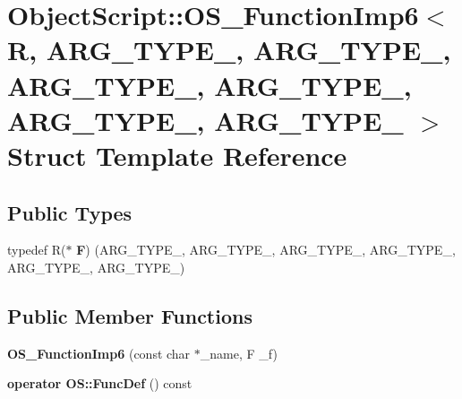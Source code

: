 \hypertarget{struct_object_script_1_1_o_s___function_imp6}{}\section{Object\+Script\+:\+:O\+S\+\_\+\+Function\+Imp6$<$ R, A\+R\+G\+\_\+\+T\+Y\+P\+E\+\_, A\+R\+G\+\_\+\+T\+Y\+P\+E\+\_, A\+R\+G\+\_\+\+T\+Y\+P\+E\+\_, A\+R\+G\+\_\+\+T\+Y\+P\+E\+\_, A\+R\+G\+\_\+\+T\+Y\+P\+E\+\_, A\+R\+G\+\_\+\+T\+Y\+P\+E\+\_ $>$ Struct Template Reference}
\label{struct_object_script_1_1_o_s___function_imp6}
\subsection*{Public Types}
\begin{DoxyCompactItemize}
\item 
typedef R($\ast$ {\bfseries F}) (A\+R\+G\+\_\+\+T\+Y\+P\+E\+\_, A\+R\+G\+\_\+\+T\+Y\+P\+E\+\_, A\+R\+G\+\_\+\+T\+Y\+P\+E\+\_, A\+R\+G\+\_\+\+T\+Y\+P\+E\+\_, A\+R\+G\+\_\+\+T\+Y\+P\+E\+\_, A\+R\+G\+\_\+\+T\+Y\+P\+E\+\_)\hypertarget{struct_object_script_1_1_o_s___function_imp6_ab11172ce58409788011abb3eb475b260}{}\label{struct_object_script_1_1_o_s___function_imp6_ab11172ce58409788011abb3eb475b260}

\end{DoxyCompactItemize}
\subsection*{Public Member Functions}
\begin{DoxyCompactItemize}
\item 
{\bfseries O\+S\+\_\+\+Function\+Imp6} (const char $\ast$\+\_\+name, F \+\_\+f)\hypertarget{struct_object_script_1_1_o_s___function_imp6_abf8cde0a153c5b8e82008bd1f6e3cff5}{}\label{struct_object_script_1_1_o_s___function_imp6_abf8cde0a153c5b8e82008bd1f6e3cff5}

\item 
{\bfseries operator O\+S\+::\+Func\+Def} () const \hypertarget{struct_object_script_1_1_o_s___function_imp6_a10988da719da0593eb34c9611e00502b}{}\label{struct_object_script_1_1_o_s___function_imp6_a10988da719da0593eb34c9611e00502b}

\end{DoxyCompactItemize}
